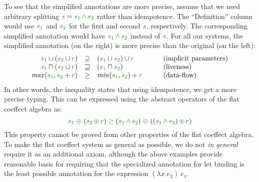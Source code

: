 To see that the simplified annotations are more precise, assume that we used arbitrary 
splitting $\cclrd{s} = \cclrd{s_1}\,\czip\,\cclrd{s_2}$ rather than idempotence. The
``Definition'' column would use $\cclrd{s_1}$ and $\cclrd{s_2}$ for the first and second 
$\cclrd{s}$, respectively. The corresponding simplified annotation would have 
$\cclrd{s_1}\,\czip\,\cclrd{s_2}$ instead of $\cclrd{s}$. For all our systems, the 
simplified annotation (on the right) is more precise than the original (on the left):
%
\begin{equation*}
\begin{array}{rclll}
\cclrd{s_1} \cup (\cclrd{s_2} \cup \cclrd{r}) &\supseteq& (\cclrd{s_1} \cup \cclrd{s_2}) \cup \cclrd{r} 
  && \textnormal{(implicit parameters)}\\
\cclrd{s_1} \sqcap (\cclrd{s_2} \sqcup \cclrd{r}) &\sqsupseteq&  (\cclrd{s_1} \sqcap \cclrd{s_2}) 
  && \textnormal{(liveness)} \\
\mathit{max}(\cclrd{s_1}, \cclrd{s_2} + \cclrd{r}) &\geq& \mathit{min}(\cclrd{s_1}, \cclrd{s_2}) + \cclrd{r} 
  &\quad& \textnormal{(data-flow)} \\
\end{array}
\end{equation*}
%
In other words, the inequality states that using idempotence, we get a more precise typing.
This can be expressed using the abstract operators of the flat coeffect algebra as:
%
\begin{equation*}
\cclrd{s_1} \;\cpar\; (\cclrd{s_2} \,\cseq\, \cclrd{r}) \;\cgeq\; 
  (\cclrd{s_1} \,\czip\, \cclrd{s_2}) \;\cpar\; ((\cclrd{s_1} \,\czip\, \cclrd{s_2}) \,\cseq\, \cclrd{r})
\end{equation*}
%
This property cannot be proved from other properties of the flat coeffect algebra. To make
the flat coeffect system as general as possible, we do not \emph{in general} require it as
an additional axiom, although the above examples provide reasonable basis for requiring 
that the specialized annotation for let binding is the least possible annotation for the 
expression $(\lambda x.e_2)~e_1$.




%                                              

